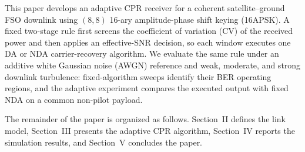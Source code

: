 This paper develops an adaptive CPR receiver for a coherent satellite--ground FSO downlink using \((8,8)\) 16-ary amplitude-phase shift keying (16APSK). A fixed two-stage rule first screens the coefficient of variation (CV) of the received power and then applies an effective-SNR decision, so each window executes one DA or NDA carrier-recovery algorithm. We evaluate the same rule under an additive white Gaussian noise (AWGN) reference and weak, moderate, and strong downlink turbulence: fixed-algorithm sweeps identify their BER operating regions, and the adaptive experiment compares the executed output with fixed NDA on a common non-pilot payload.

The remainder of the paper is organized as follows. Section~II defines the link model, Section~III presents the adaptive CPR algorithm, Section~IV reports the simulation results, and Section~V concludes the paper.
